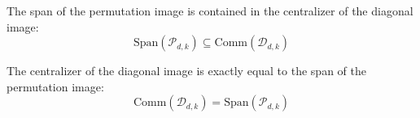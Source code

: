 \begin{theorem}\label{thm:span_permImage_le_centralizer_diagImage}
  \leanok
  The span of the permutation image is contained in the centralizer of the diagonal image:
  \begin{equation}
    \text{Span}(\mathcal{P}_{d,k}) \subseteq \text{Comm}(\mathcal{D}_{d,k})
  \end{equation}
\end{theorem}

\begin{theorem}\label{thm:schur_weyl}
  \leanok
  The centralizer of the diagonal image is exactly equal to the span of the permutation image:
  \begin{equation}
    \text{Comm}(\mathcal{D}_{d,k}) = \text{Span}(\mathcal{P}_{d,k})
  \end{equation}
\end{theorem}
